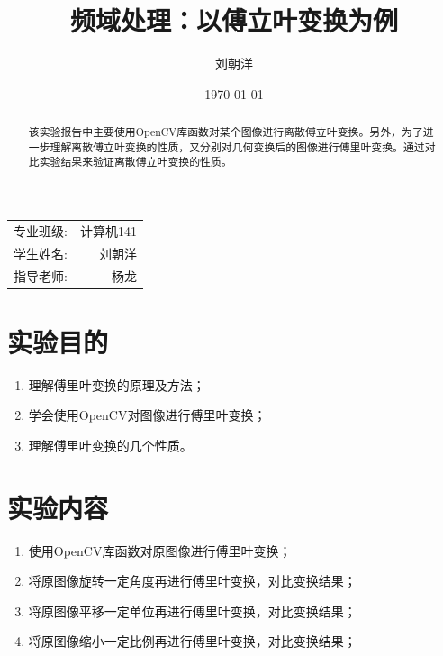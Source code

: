 \documentclass[hyperref,UTF8]{ctexart}
\title{频域处理：以傅立叶变换为例} %
\author{\kaishu 刘朝洋} %
\date{\today} %
\begin{document}
\maketitle %

\begin{center}
\begin{tabular}{l r}
专业班级: & 计算机141 \\ %
学生姓名: & 刘朝洋 \\ %
指导老师: & 杨龙 %
\end{tabular}
\end{center}

\begin{abstract}
该实验报告中主要使用OpenCV库函数对某个图像进行离散傅立叶变换。另外，为了进一步理解离散傅立叶变换的性质，又分别对几何变换后的图像进行傅里叶变换。通过对比实验结果来验证离散傅立叶变换的性质。
\end{abstract}

\pagestyle{plain}

\section{实验目的}

\begin{enumerate}

\item 理解傅里叶变换的原理及方法；
\item 学会使用OpenCV对图像进行傅里叶变换；
\item 理解傅里叶变换的几个性质。

\end{enumerate}
 

\section{实验内容}

\begin{enumerate}

\item 使用OpenCV库函数对原图像进行傅里叶变换；
\item 将原图像旋转一定角度再进行傅里叶变换，对比变换结果；
\item 将原图像平移一定单位再进行傅里叶变换，对比变换结果；
\item 将原图像缩小一定比例再进行傅里叶变换，对比变换结果；

\end{enumerate}
\end{document}
